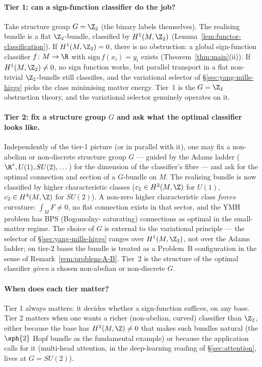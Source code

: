 \paragraph{Tier 1: can a sign-function classifier do the job?} Take
structure group $G=\Z_2$ (the binary labels themselves). The
realising bundle is a flat $\Z_2$-bundle, classified by
$H^1(M,\Z_2)$ (Lemma~\ref{lem:functor-classification}). If
$H^1(M,\Z_2)=0$, there is no obstruction: a global sign-function
classifier $f\colon M\to\R$ with $\mathrm{sign}\,f(x_i)=y_i$ exists
(Theorem~\ref{thm:main}(ii)). If $H^1(M,\Z_2)\neq 0$, no sign
function works, but parallel transport in a flat non-trivial
$\Z_2$-bundle still classifies, and the variational selector of
\S\ref{sec:yang-mills-higgs} picks the class minimising matter
energy. Tier~1 is the $G=\Z_2$ obstruction theory, and the
variational selector genuinely operates on it.

\paragraph{Tier 2: fix a structure group $G$ and ask what the
optimal classifier looks like.} Independently of the tier-1 picture
(or in parallel with it), one may fix a non-abelian or non-discrete
structure group $G$ --- guided by the Adams ladder
($\R^*, U(1), SU(2),\dots$) for the dimension of the classifier's
fibre --- and ask for the optimal connection and section of a
$G$-bundle on $M$. The realising bundle is now classified by higher
characteristic classes ($c_1\in H^2(M,\Z)$ for $U(1)$,
$c_2\in H^4(M,\Z)$ for $SU(2)$). A non-zero higher characteristic
class \emph{forces} curvature: $\int_M F\neq 0$, no flat connection
exists in that sector, and the YMH problem has BPS (Bogomolny-
saturating) connections as optimal in the small-matter regime. The
choice of $G$ is external to the variational principle --- the
selector of \S\ref{sec:yang-mills-higgs} ranges over
$H^1(M,\Z_2)$, not over the Adams ladder; on tier-2 bases the bundle
is treated as a Problem~B configuration in the sense of
Remark~\ref{rem:problem-A-B}.
Tier~2 is the structure of the optimal classifier \emph{given} a
chosen non-abelian or non-discrete $G$.

\paragraph{When does each tier matter?} Tier 1 always matters: it
decides whether a sign-function suffices, on any base. Tier 2
matters when one wants a richer (non-abelian, curved) classifier
than $\Z_2$, either because the base has $H^2(M,\Z)\neq 0$ that
makes such bundles natural (the $\sph{2}$ Hopf bundle as the
fundamental example) or because the application calls for it
(multi-head attention, in the deep-learning reading of
\S\ref{sec:attention}, lives at $G=SU(2)$).

